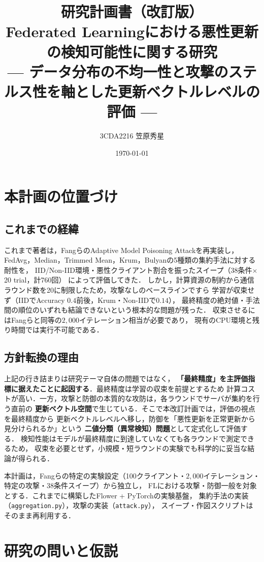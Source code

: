 \documentclass[a4j, dvipdfmx]{jsarticle}  %
\title{研究計画書（改訂版）\\
\large Federated Learningにおける悪性更新の検知可能性に関する研究\\
\normalsize --- データ分布の不均一性と攻撃のステルス性を軸とした更新ベクトルレベルの評価 ---}
\author{3CDA2216 笠原秀星}
\date{\today}
\begin{document}
\maketitle

\section{本計画の位置づけ}

\subsection{これまでの経緯}

これまで著者は，Fangら\cite{fang2020local}のAdaptive Model Poisoning Attackを再実装し，
FedAvg，Median，Trimmed Mean，Krum，Bulyanの5種類の集約手法に対する耐性を，
IID/Non-IID環境・悪性クライアント割合を振ったスイープ（38条件$\times$20 trial，計760回）
によって評価してきた．
しかし，計算資源の制約から通信ラウンド数を20に制限したため，攻撃なしのベースラインですら
学習が収束せず（IIDでAccuracy $0.4$前後，Krum・Non-IIDで$0.14$），
最終精度の絶対値・手法間の順位のいずれも結論できないという根本的な問題が残った．
収束させるにはFangらと同等の$2{,}000$イテレーション相当が必要であり，
現有のCPU環境と残り時間では実行不可能である．

\subsection{方針転換の理由}

上記の行き詰まりは研究テーマ自体の問題ではなく，
\textbf{「最終精度」を主評価指標に据えたことに起因する}．最終精度は学習の収束を前提とするため
計算コストが高い．一方，攻撃と防御の本質的な攻防は，各ラウンドでサーバが集約を行う直前の
\textbf{更新ベクトル空間}で生じている．そこで本改訂計画では，評価の視点を最終精度から
更新ベクトルレベルへ移し，防御を「悪性更新を正常更新から見分けられるか」という
\textbf{二値分類（異常検知）問題}として定式化して評価する．
検知性能はモデルが最終精度に到達していなくても各ラウンドで測定できるため，
収束を必要とせず，小規模・短ラウンドの実験でも科学的に妥当な結論が得られる．

本計画は，Fangらの特定の実験設定（100クライアント・$2{,}000$イテレーション・
特定の攻撃・38条件スイープ）から独立し，
FLにおける攻撃・防御一般を対象とする．これまでに構築したFlower + PyTorchの実験基盤，
集約手法の実装（\texttt{aggregation.py}），攻撃の実装（\texttt{attack.py}），
スイープ・作図スクリプトはそのまま再利用する．

\section{研究の問いと仮説}
\end{document}
